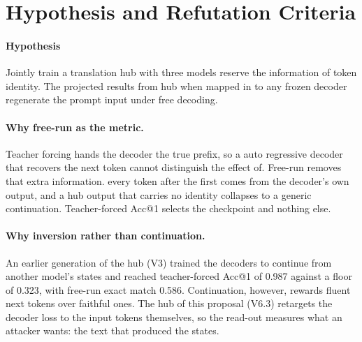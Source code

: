 \section{Hypothesis and Refutation Criteria}\label{sec:hub:hypothesis}

\paragraph{Hypothesis}
Jointly train a translation hub with three models reserve the information of token identity. The projected results from hub when mapped in to any frozen decoder regenerate the prompt input under free decoding.   

\paragraph{Why free-run as the metric.} Teacher forcing hands the decoder the true prefix, so a auto regressive decoder that recovers the next token cannot distinguish the effect of.
Free-run removes that extra information. every token after the first comes from the decoder's own output, and a hub output that carries no identity collapses to a generic continuation. Teacher-forced Acc@1 selects the checkpoint and nothing else.

\paragraph{Why inversion rather than continuation.} An earlier generation of the hub (V3) trained the decoders to continue from another model's states and reached teacher-forced Acc@1 of 0.987 against a floor of 0.323, with free-run exact match 0.586. Continuation, however, rewards fluent next tokens over faithful ones. The hub of this proposal (V6.3) retargets the decoder loss to the input tokens themselves, so the read-out measures what an attacker wants: the text that produced the states.

